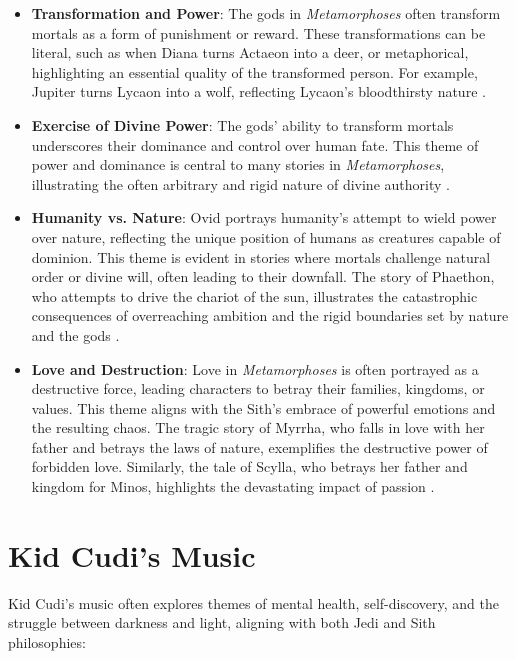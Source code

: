 \documentclass{article}
\begin{document}
\begin{itemize}
    \item \textbf{Transformation and Power}: The gods in \textit{Metamorphoses} often transform mortals as a form of punishment or reward. These transformations can be literal, such as when Diana turns Actaeon into a deer, or metaphorical, highlighting an essential quality of the transformed person. For example, Jupiter turns Lycaon into a wolf, reflecting Lycaon's bloodthirsty nature \cite{sharrock2020metamorphic}.
    \item \textbf{Exercise of Divine Power}: The gods' ability to transform mortals underscores their dominance and control over human fate. This theme of power and dominance is central to many stories in \textit{Metamorphoses}, illustrating the often arbitrary and rigid nature of divine authority \cite{gallagher2014metamorphosis}.
    \item \textbf{Humanity vs. Nature}: Ovid portrays humanity's attempt to wield power over nature, reflecting the unique position of humans as creatures capable of dominion. This theme is evident in stories where mortals challenge natural order or divine will, often leading to their downfall. The story of Phaethon, who attempts to drive the chariot of the sun, illustrates the catastrophic consequences of overreaching ambition and the rigid boundaries set by nature and the gods \cite{sharrock2020metamorphic}.
    \item \textbf{Love and Destruction}: Love in \textit{Metamorphoses} is often portrayed as a destructive force, leading characters to betray their families, kingdoms, or values. This theme aligns with the Sith's embrace of powerful emotions and the resulting chaos. The tragic story of Myrrha, who falls in love with her father and betrays the laws of nature, exemplifies the destructive power of forbidden love. Similarly, the tale of Scylla, who betrays her father and kingdom for Minos, highlights the devastating impact of passion \cite{gallagher2014metamorphosis}.
\end{itemize}

\section*{Kid Cudi's Music}

Kid Cudi's music often explores themes of mental health, self-discovery, and the struggle between darkness and light, aligning with both Jedi and Sith philosophies:
\end{document}
